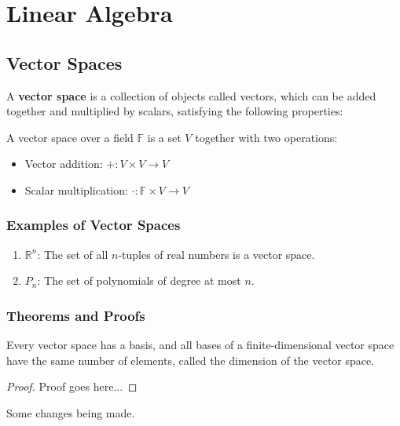 \chapter{Linear Algebra}

\section{Vector Spaces}\cite{author2024book}

A \textbf{vector space} is a collection of objects called vectors, which can be added together and multiplied by scalars, satisfying the following properties:

\begin{definition}
A vector space over a field $\mathbb{F}$ is a set $V$ together with two operations:
\begin{itemize}
    \item Vector addition: $+: V \times V \to V$
    \item Scalar multiplication: $\cdot: \mathbb{F} \times V \to V$
\end{itemize}
\end{definition}

\subsection{Examples of Vector Spaces}

\begin{enumerate}
    \item $\mathbb{R}^n$: The set of all $n$-tuples of real numbers is a vector space.
    \item $P_n$: The set of polynomials of degree at most $n$.
\end{enumerate}

\subsection{Theorems and Proofs}

\begin{theorem}
Every vector space has a basis, and all bases of a finite-dimensional vector space have the same number of elements, called the dimension of the vector space.
\end{theorem}

\begin{proof}
Proof goes here...
\end{proof}

Some changes being made.